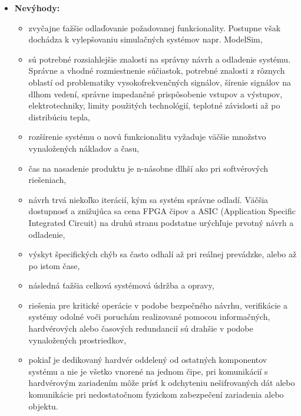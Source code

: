 \documentclass[12pt,a4paper,oneside,openright]{report}
\begin{document}
\begin{itemize}
\begin{itemize}

		\end{itemize}
		\item \textbf{Nevýhody:}
		\begin{itemize}
			\item zvyčajne ťažšie odlaďovanie požadovanej funkcionality. Postupne však dochádza k vylepšovaniu simulačných systémov napr. ModelSim,
			\item sú potrebné rozsiahlejšie znalosti na správny návrh a odladenie systému. Správne a vhodné rozmiestnenie súčiastok, potrebné znalosti z rôznych oblastí od problematiky vysokofrekvenčných signálov, šírenie signálov na dlhom vedení, správne impedančné prispôsobenie vstupov a výstupov, elektrotechniky, limity použitých technológií, teplotné závislosti až po distribúciu tepla,
			\item rozšírenie systému o novú funkcionalitu vyžaduje väčšie množstvo vynaložených nákladov a času,
			\item čas na nasadenie produktu je n-násobne dlhší ako pri softvérových riešeniach,
			\item návrh trvá niekoľko iterácií, kým sa systém správne odladí. Väčšia dostupnosť a znižujúca sa cena FPGA čipov a ASIC (Application Specific Integrated Circuit) na druhú stranu podstatne urýchľuje prvotný návrh a odladenie,
			\item výskyt špecifických chýb sa často odhalí až pri reálnej prevádzke, alebo až po istom čase,
			\item následná ťažšia celková systémová údržba a opravy,
			\item riešenia pre kritické operácie v podobe bezpečného návrhu, verifikácie a systémy odolné voči poruchám realizované pomocou informačných, hardvérových alebo časových redundancií sú drahšie v podobe vynaložených prostriedkov,
			\item pokiaľ je dedikovaný hardvér oddelený od ostatných komponentov systému a nie je všetko vnorené na jednom čipe, pri komunikácií s hardvérovým zariadením môže prísť k odchyteniu nešifrovaných dát alebo komunikácie pri nedostatočnom fyzickom zabezpečení zariadenia alebo objektu.
			
		\end{itemize}
	\end{itemize}
\end{document}

